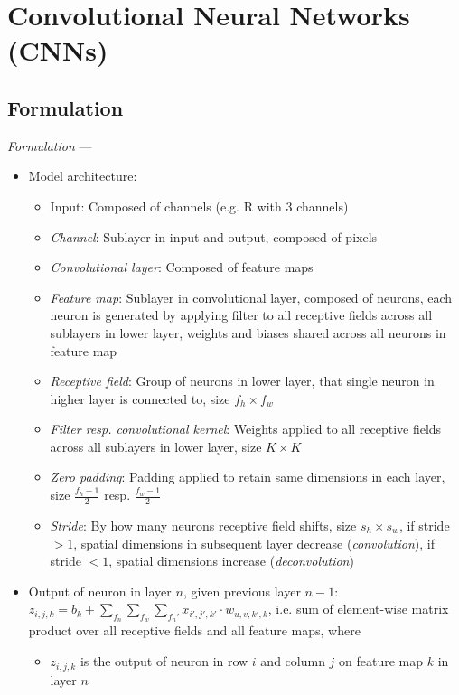 \section{Convolutional Neural Networks (CNNs)}
\subsection*{Formulation}
\emph{Formulation} --- 
\begin{itemize}
    \item Model architecture: 
    \begin{itemize}
        \item Input: Composed of channels (e.g. R with 3 channels)
        \item \emph{Channel}: Sublayer in input and output, composed of pixels
        \item \emph{Convolutional layer}: Composed of feature maps
        \item \emph{Feature map}: Sublayer in convolutional layer, composed of neurons, each neuron is generated by applying filter to all receptive fields across all sublayers in lower layer, weights and biases shared across all neurons in feature map
        \item \emph{Receptive field}: Group of neurons in lower layer, that single neuron in higher layer is connected to, size $f_h \times f_w$
        \item \emph{Filter resp. convolutional kernel}: Weights applied to all receptive fields across all sublayers in lower layer, size $K \times K$
        \item \emph{Zero padding}: Padding applied to retain same dimensions in each layer, size $\frac{f_h - 1}{2}$ resp. $\frac{f_w - 1}{2}$
        \item \emph{Stride}: By how many neurons receptive field shifts, size $s_h \times s_w$, if stride $> 1$, spatial dimensions in subsequent layer decrease (\emph{convolution}), if stride $< 1$, spatial dimensions increase (\emph{deconvolution})
    \end{itemize}
    \item Output of neuron in layer $n$, given previous layer $n-1$: \\
    $z_{i,j,k} = b_k + \sum_{f_n} \sum_{f_w} \sum_{f_n'} x_{i',j',k'} \cdot w_{u,v,k',k}$, i.e. sum of element-wise matrix product over all receptive fields and all feature maps, where
    \begin{itemize}
        \item $z_{i,j,k}$ is the output of neuron in row $i$ and column $j$ on feature map $k$ in layer $n$

\end{itemize}
\end{itemize}
